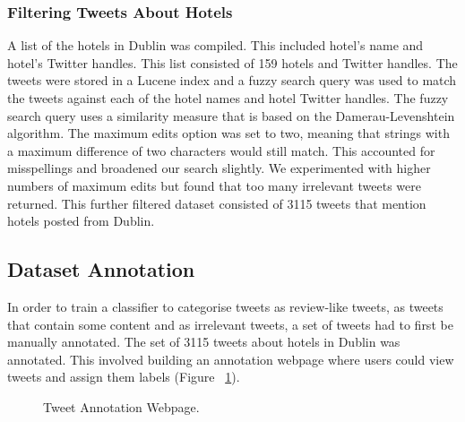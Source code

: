 \subsubsection{Filtering Tweets About Hotels}
A list of the hotels in Dublin was compiled. This included hotel's name and hotel's Twitter handles. This list consisted of 159 hotels and Twitter handles. The tweets were stored in a Lucene index and a fuzzy search query was used to match the tweets against each of the hotel names and hotel Twitter handles. The fuzzy search query uses a similarity measure that is based on the Damerau-Levenshtein algorithm. The maximum edits option was set to two, meaning that strings with a maximum difference of two characters would still match. This accounted for misspellings and broadened our search slightly. We experimented with higher numbers of maximum edits but found that too many irrelevant tweets were returned. This further filtered dataset consisted of 3115 tweets that mention hotels posted from Dublin.

\subsection{Dataset Annotation}

In order to train a classifier to categorise tweets as review-like tweets, as tweets that contain some content and as irrelevant tweets, a set of tweets had to first be manually annotated. The set of 3115 tweets about hotels in Dublin was annotated. This involved building an annotation webpage where users could view tweets and assign them labels (Figure ~\ref{fig:webpage}).

\begin{figure}[h!]
\centering
{}
\caption{\label{fig:webpage} Tweet Annotation Webpage.}
\end{figure}

